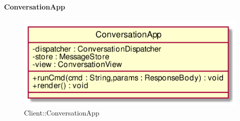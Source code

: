 \hypertarget{ConversationApp_label}{\paragraph{ConversationApp}}
\begin{figure}[h]
	\centering
	\includegraphics[width=\textwidth,height=\textheight,keepaspectratio]{images/ClassConversationApp.png}
	\caption{Client::ConversationApp}
\end{figure}
